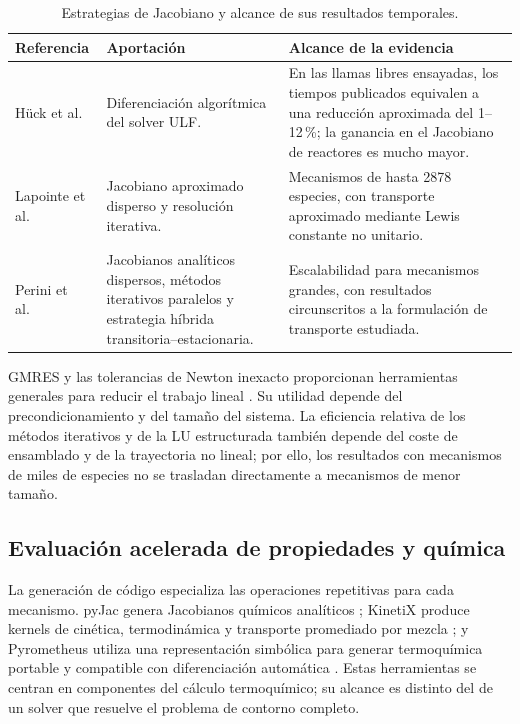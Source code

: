 \documentclass[12pt,a4paper,twoside,openany]{book}
\begin{document}
\begin{table}[htbp]
\centering
\small
\caption{Estrategias de Jacobiano y alcance de sus resultados temporales.}
\label{tab:literature-acceleration-levels}
\begin{tabularx}{\textwidth}{@{}p{}YY@{}}
\toprule
\textbf{Referencia} & \textbf{Aportación} & \textbf{Alcance de la evidencia} \\
\midrule
Hück et al.\ \cite{Huck2018} &
Diferenciación algorítmica del solver ULF. &
En las llamas libres ensayadas, los tiempos publicados equivalen a una
reducción aproximada del 1--12\,\%; la ganancia en el Jacobiano de reactores
es mucho mayor. \\
Lapointe et al.\ \cite{Lapointe2019} &
Jacobiano aproximado disperso y resolución iterativa. &
Mecanismos de hasta 2878 especies, con transporte aproximado mediante
Lewis constante no unitario. \\
Perini et al.\ \cite{Perini2025} &
Jacobianos analíticos dispersos, métodos iterativos paralelos y estrategia
híbrida transitoria--estacionaria. &
Escalabilidad para mecanismos grandes, con resultados circunscritos a
la formulación de transporte estudiada. \\
\bottomrule
\end{tabularx}
\end{table}

GMRES y las tolerancias de Newton inexacto proporcionan herramientas generales
para reducir el trabajo lineal \cite{SaadSchultz1986,EisenstatWalker1996}.
Su utilidad depende del precondicionamiento y del tamaño del sistema. La
eficiencia relativa de los métodos iterativos y de la LU estructurada también
depende del coste de ensamblado y de la trayectoria no lineal; por ello, los
resultados con mecanismos de miles de especies no se trasladan directamente
a mecanismos de menor tamaño.

\subsection{Evaluación acelerada de propiedades y química}
\label{sec:chem-transport-acceleration}

La generación de código especializa las operaciones repetitivas para cada
mecanismo. pyJac genera Jacobianos químicos analíticos \cite{Niemeyer2017};
KinetiX produce kernels de cinética, termodinámica y transporte promediado por
mezcla \cite{DanciuKinetiX2025}; y Pyrometheus utiliza una representación
simbólica para generar termoquímica portable y compatible con diferenciación
automática \cite{CisnerosGaribay2026}. Estas herramientas se centran en componentes
del cálculo termoquímico; su alcance es distinto del de un solver que resuelve
el problema de contorno completo.
\end{document}

